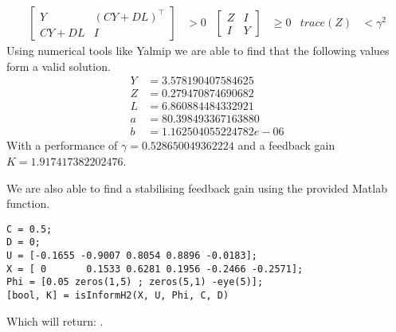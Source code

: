 \begin{align*}
\begin{bmatrix} Y & (CY + DL)^\top \\ CY + DL & I \end{bmatrix} &> 0 &
\begin{bmatrix} Z & I \\ I & Y \end{bmatrix} &\geq 0 &
trace(Z) &< \gamma^2
\end{align*}
Using numerical tools like Yalmip we are able to find that the following values form a valid solution.
\begin{align*}
	Y &= 3.578190407584625 \\
	Z &= 0.279470874690682 \\
	L &= 6.860884484332921 \\
	a &= 80.398493367163880 \\
	b &= 1.162504055224782e-06
\end{align*}
With a performance of $\gamma = 0.528650049362224$ and a feedback gain $K = 1.917417382202476$.


We are also able to find a stabilising feedback gain using the provided Matlab function.
\begin{lstlisting}
C = 0.5;
D = 0;
U = [-0.1655 -0.9007 0.8054 0.8896 -0.0183];
X = [ 0       0.1533 0.6281 0.1956 -0.2466 -0.2571];
Phi = [0.05 zeros(1,5) ; zeros(5,1) -eye(5)];
[bool, K] = isInformH2(X, U, Phi, C, D)
\end{lstlisting}
Which will return: \mon{[ 1, 1.917417382202475 ]}.